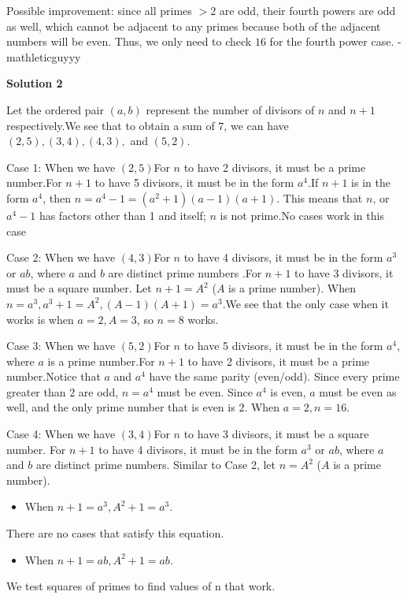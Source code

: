 \begin{enumerate}
 
Possible improvement: since all primes $>2$ are odd, their fourth powers are odd as well, which cannot be adjacent to any primes because both of the adjacent numbers will be even. Thus, we only need to check $16$ for the fourth power case. - mathleticguyyy

 



\textbf{Solution 2}

Let the ordered pair $(a,b)$ represent the number of divisors of $n$ and $n+1$ respectively.We see that to obtain a sum of $7$, we can have $(2,5), (3,4), (4,3),$ and $(5,2)$.

 
Case 1: When we have $(2,5)$For $n$ to have 2 divisors, it must be a prime number.For $n+1$ to have 5 divisors, it must be in the form $a^4$.If $n+1$ is in the form $a^4$, then $n = a^4-1 = (a^2+1)(a-1)(a+1)$. This means that $n$, or $a^4-1$ has factors other than 1 and itself; $n$ is not prime.No cases work in this case

 
Case 2: When we have $(4,3)$For $n$ to have 4 divisors, it must be in the form $a^3$ or $ab$, where $a$ and $b$ are distinct prime numbers .For $n+1$ to have 3 divisors, it must be a square number. Let $n+1 = A^2$ ($A$ is a prime number). When $n = a^3, a^3+1 = A^2, (A-1)(A+1)=a^3$.We see that the only case when it works is when $a=2, A=3$, so $n=8$ works.

 
Case 3: When we have $(5,2)$For $n$ to have 5 divisors, it must be in the form $a^4$, where $a$ is a prime number.For $n+1$ to have 2 divisors, it must be a prime number.Notice that $a$ and $a^4$ have the same parity (even/odd). Since every prime greater than 2 are odd, $n = a^4$ must be even. Since $a^4$ is even, $a$ must be even as well, and the only prime number that is even is 2. When $a=2, n=16$.

 
Case 4: When we have $(3,4)$For $n$ to have 3 divisors, it must be a square number. For $n+1$ to have 4 divisors, it must be in the form $a^3$ or $ab$, where $a$ and $b$ are distinct prime numbers. Similar to Case 2, let $n = A^2$ ($A$ is a prime number).

 
            \begin{itemize}
        \item When $n+1 = a^3, A^2+1 = a^3$.
            \end{itemize}
            There are no cases that satisfy this equation.

 
            \begin{itemize}
        \item When $n+1=ab, A^2+1 = ab$.
            \end{itemize}
            We test squares of primes to find values of n that work.


\end{enumerate}
